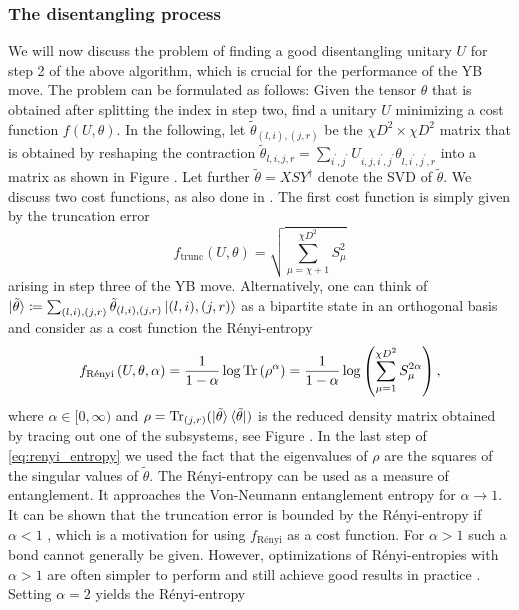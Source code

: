 \subsubsection*{\hspace{132pt}The disentangling process}
We will now discuss the problem of finding a good disentangling unitary $U$ for step 2 of the above algorithm, which is crucial for the performance of the YB move. The problem can be formulated as follows: Given the tensor $\theta$ that is obtained after splitting the index in step two, find a unitary $U$ minimizing a cost function $f(U, \theta)$. In the following, let $\tilde{\theta}_{(l,i),(j,r)}$ be the $\chi D^2\times \chi D^2$ matrix that is obtained by reshaping the contraction $\tilde{\theta}_{l,i,j,r} = \sum_{i^\prime,j^\prime} U_{i,j,i^\prime,j^\prime}\theta_{l,i^\prime,j^\prime,r}$ into a matrix as shown in Figure . Let further $\tilde{\theta} = XSY^\dagger$ denote the SVD of $\tilde{\theta}$. We discuss two cost functions, as also done in \cite{cite:effefficient_simulation_of_dynamics_in_two_dimensional_quantum_spin_systems}. The first cost function is simply given by the truncation error
\begin{equation}
	\label{eq:YB_move_disent_cost_function_truncation_error}
	f_\text{trunc}\left(U,\theta\right) = \sqrt{\sum_{\mu = \chi+1}^{\chi D^2}S_\mu^2}
\end{equation}
arising in step three of the YB move. Alternatively, one can think of $|\tilde{\theta}\rangle \coloneqq \sum_{(l,i), (j,r)}\tilde{\theta}_{(l,i),(j,r)}\ket{(l,i), (j, r)}$ as a bipartite state in an orthogonal basis and consider as a cost function the Rényi-entropy
\begin{equation}
	\label{eq:renyi_entropy}
	f_\text{Rényi}\left(U,\theta,\alpha\right) = \frac{1}{1-\alpha}\log\operatorname{Tr}\left(\rho^\alpha\right) = \frac{1}{1-\alpha}\log\left(\sum_{\mu=1}^{\chi D^2}S_\mu^{2\alpha}\right),
\end{equation}
where $\alpha\in[0,\infty)$ and $\rho = \operatorname{Tr}_{(j, r)}(\ket{\tilde{\theta}}\bra{\tilde{\theta}})$ is the reduced density matrix obtained by tracing out one of the subsystems, see Figure . In the last step of \eqref{eq:renyi_entropy} we used the fact that the eigenvalues of $\rho$ are the squares of the singular values of $\tilde{\theta}$. The Rényi-entropy can be used as a measure of entanglement. It approaches the Von-Neumann entanglement entropy for $\alpha\rightarrow 1$. It can be shown that the truncation error is bounded by the Rényi-entropy if $\alpha < 1$ \cite{cite:mps_represent_ground_states_faithfully}, which is a motivation for using $f_\text{Rényi}$ as a cost function. For $\alpha > 1$ such a bond cannot generally be given. However, optimizations of Rényi-entropies with $\alpha > 1$ are often simpler to perform and still achieve good results in practice \cite{cite:isometric_tensor_network_states_in_two_dimensions, cite:efficient_simulation_of_dynamics_in_two_dimensional_quantum_spin_systems, cite:finding_purifications_with_minimal_entanglement}. Setting $\alpha = 2$ yields the Rényi-entropy
